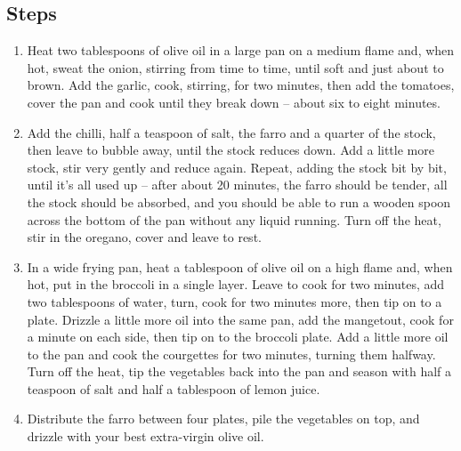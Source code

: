 \documentclass{book}
\begin{document}
\subsection*{Steps}
\begin{enumerate}
\item Heat two tablespoons of olive oil in a large pan on a medium flame and, when hot, sweat the onion, stirring from time to time, until soft and just about to brown. Add the garlic, cook, stirring, for two minutes, then add the tomatoes, cover the pan and cook until they break down – about six to eight minutes.
\item Add the chilli, half a teaspoon of salt, the farro and a quarter of the stock, then leave to bubble away, until the stock reduces down. Add a little more stock, stir very gently and reduce again. Repeat, adding the stock bit by bit, until it’s all used up – after about 20 minutes, the farro should be tender, all the stock should be absorbed, and you should be able to run a wooden spoon across the bottom of the pan without any liquid running. Turn off the heat, stir in the oregano, cover and leave to rest.
\item In a wide frying pan, heat a tablespoon of olive oil on a high flame and, when hot, put in the broccoli in a single layer. Leave to cook for two minutes, add two tablespoons of water, turn, cook for two minutes more, then tip on to a plate. Drizzle a little more oil into the same pan, add the mangetout, cook for a minute on each side, then tip on to the broccoli plate. Add a little more oil to the pan and cook the courgettes for two minutes, turning them halfway. Turn off the heat, tip the vegetables back into the pan and season with half a teaspoon of salt and half a tablespoon of lemon juice.
\item Distribute the farro between four plates, pile the vegetables on top, and drizzle with your best extra-virgin olive oil.
\end{enumerate}
\newpage
\end{document}
